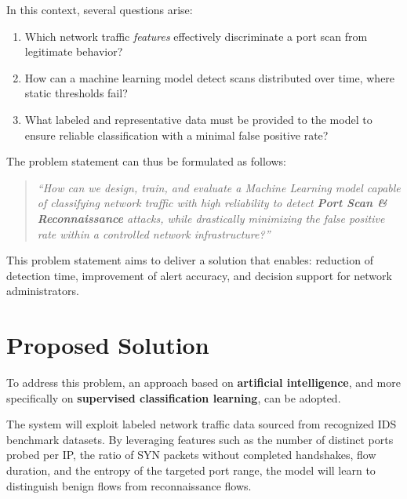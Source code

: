 \documentclass[12pt,a4paper]{article}
\begin{document}
In this context, several questions arise:

\begin{enumerate}[nosep,leftmargin=1.5em]
  \item Which network traffic \textit{features} effectively discriminate a port
        scan from legitimate behavior?
  \item How can a machine learning model detect scans distributed over time,
        where static thresholds fail?
  \item What labeled and representative data must be provided to the model to
        ensure reliable classification with a minimal false positive rate?
\end{enumerate}

\vspace{0.5em}
\noindent The problem statement can thus be formulated as follows:

\begin{quote}
\itshape
``How can we design, train, and evaluate a Machine Learning model capable of
classifying network traffic with high reliability to detect
\textbf{Port Scan \& Reconnaissance} attacks, while drastically minimizing the
false positive rate within a controlled network infrastructure?''
\end{quote}

This problem statement aims to deliver a solution that enables: reduction of
detection time, improvement of alert accuracy, and decision support for network
administrators.

\section{Proposed Solution}

To address this problem, an approach based on \textbf{artificial intelligence},
and more specifically on \textbf{supervised classification learning}, can be
adopted.

The system will exploit labeled network traffic data sourced from recognized
IDS benchmark datasets. By leveraging features such as the number of distinct
ports probed per IP, the ratio of SYN packets without completed handshakes,
flow duration, and the entropy of the targeted port range, the model will learn
to distinguish benign flows from reconnaissance flows.
\end{document}

